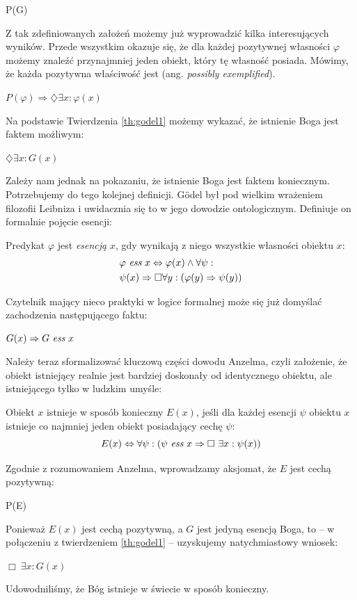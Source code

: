 \documentclass[12pt]{article}
\begin{document}
\begin{multicols}{2}
\begin{axiom-g} \label{axiom:godel4}
	P(G)
\end{axiom-g}
Z tak zdefiniowanych założeń możemy już wyprowadzić kilka interesujących wyników. Przede wszystkim okazuje się, że dla każdej pozytywnej własności $\varphi$ możemy znaleźć przynajmniej jeden obiekt, który tę własność posiada. Mówimy, że każda pozytywna właściwość jest  (ang. \emph{possibly exemplified}). 
\begin{theorem-g} \label{th:godel1}
	$P(\varphi) \Rightarrow \diamondsuit \exists x: \varphi(x)$
\end{theorem-g}
Na podstawie Twierdzenia \ref{th:godel1} możemy wykazać, że istnienie Boga jest faktem możliwym:
\begin{theorem-g} \label{th:godel2}
	$\diamondsuit \exists x: G(x)$
\end{theorem-g}
Zależy nam jednak na pokazaniu, że istnienie Boga jest faktem koniecznym. Potrzebujemy do tego kolejnej definicji. G\"odel był pod wielkim wrażeniem filozofii Leibniza i uwidacznia się to w jego dowodzie ontologicznym. Definiuje on formalnie pojęcie esencji:
\begin{definition-g}
	Predykat $\varphi$ jest \emph{esencją} $x$, gdy wynikają z niego wszystkie własności obiektu $x$:
	\begin{align*}
	& \varphi\ \emph{ess}\ x \Leftrightarrow \varphi(x) \wedge \forall \psi: \\ 
	& \psi(x) \Rightarrow \Box \forall y: \left( \varphi(y) \Rightarrow \psi(y) \right)
	\end{align*}
\end{definition-g}
Czytelnik mający nieco praktyki w logice formalnej może się już domyślać zachodzenia następującego faktu:
\begin{corollary}
	$G(x) \Rightarrow G\ \emph{ess}\ x$
\end{corollary}
Należy teraz sformalizować kluczową części dowodu Anzelma, czyli założenie, że obiekt istniejący realnie jest bardziej doskonały od identycznego obiektu, ale istniejącego tylko w ludzkim umyśle: 
\begin{definition-g}
	Obiekt $x$ istnieje w sposób konieczny $E(x)$, jeśli dla każdej esencji $\psi$ obiektu $x$ istnieje co najmniej jeden obiekt posiadający cechę $\psi$:
	\begin{equation*}
	E(x) \Leftrightarrow \forall \psi: \left( \psi\ \emph{ess}\ x \Rightarrow\Box\ \exists x: \psi(x) \right)
	\end{equation*}
\end{definition-g}
Zgodnie z rozumowaniem Anzelma, wprowadzamy aksjomat, że $E$ jest cechą pozytywną:
\begin{axiom-g}
	P(E)
\end{axiom-g}
Ponieważ $E(x)$ jest cechą pozytywną, a $G$ jest jedyną esencją Boga, to -- w połączeniu z twierdzeniem \ref{th:godel1} -- uzyskujemy natychmiastowy wniosek:
\begin{theorem-g} \label{th:goedel3}
	$\Box\ \exists x: G(x)$
\end{theorem-g}
Udowodniliśmy, że Bóg istnieje w świecie w sposób konieczny. 


\end{multicols}
\end{document}
